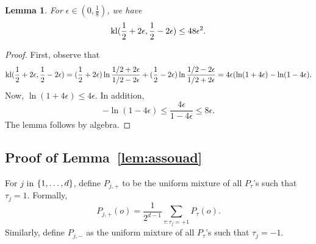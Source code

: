 \documentclass{article}
\newtheorem{lemma}{Lemma}
\DeclareMathOperator*{\kl}{{\rm kl}}
\DeclareMathOperator*{\KL}{{\rm KL}}
\newcommand{\EE}{\mathbb{E}}
\newcommand*{\one}{{\bf 1}}
\begin{document}

\begin{lemma}
For $\epsilon \in (0,\frac18)$, we have
\[ \kl(\frac12+2\epsilon, \frac12-2\epsilon) \leq 48\epsilon^2. \]
\label{lem:centr-kl}
\end{lemma}
\begin{proof}
First, observe that
\[ \kl(\frac12+2\epsilon, \frac12-2\epsilon) =
(\frac12+2\epsilon) \ln\frac{1/2+2\epsilon}{1/2-2\epsilon} +
(\frac12-2\epsilon) \ln\frac{1/2-2\epsilon}{1/2+2\epsilon}
= 4\epsilon(\ln(1+4\epsilon) - \ln(1-4\epsilon).
\]
Now, $\ln(1+4\epsilon) \leq 4\epsilon$. In addition,
\[ -\ln(1-4\epsilon) \leq \frac{4\epsilon}{1-4\epsilon} \leq 8\epsilon. \]
The lemma follows by algebra.
\end{proof}


\subsection{Proof of Lemma~\ref{lem:assouad}}
For $j$ in $\cbr{1,\ldots,d}$, define $P_{j,+}$ to be the uniform mixture of all $P_\tau$'s such that $\tau_j = 1$. Formally,
\[ P_{j,+}(o) = \frac{1}{2^{d-1}} \sum_{\tau: \tau_j = +1} P_\tau(o). \]
Similarly, define $P_{j,-}$ as the uniform mixture of all $P_\tau$'s such that $\tau_j = -1$.
\end{document}
